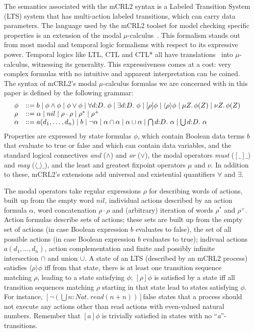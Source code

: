 \documentclass[letter]{llncs}
\begin{document}
The semantics associated with the mCRL2 syntax is a Labeled Transition System (LTS)
system that has multi-action labeled transitions, which can carry data parameters. The language used by the mCRL2
toolset for model checking specific properties is an extension of the modal
$\mu$-calculus~\cite{Emerson97modelchecking}. This formalism stands out from most modal and temporal logic formalisms with respect to its
expressive power. Temporal logics like LTL, CTL and CTL* all have translations~\cite{cranen2010linear,cranen2011linear} into $\mu$-calculus,
witnessing its generality. This expressiveness comes at a cost: very complex formulas with no intuitive and apparent interpretation can be coined. 
The syntax of mCRL2's modal $\mu$-calculus formulas we are concerned with in this paper
is defined by the following grammar:
\vspace{-5 pt}
\[
\begin{array}{ll}
\phi & ::= b \mid \phi\wedge\phi \mid \phi\vee\phi \mid \forall d{:}D.~\phi \mid \exists d{:}D.~\phi
\mid [\rho]\phi \mid \langle\rho\rangle\phi \mid \mu Z\ldotp\phi(Z) \mid \nu Z\ldotp\phi(Z) \\
\rho & ::= \alpha \mid nil \mid \rho\cdot\rho \mid \rho^* \mid \rho^+ \\
\alpha & ::= a(d_1,\dots,d_n) \mid b \mid \neg \alpha \mid \alpha\cap\alpha \mid 
\alpha\cup\alpha \mid \bigcap{d{:}D}.~\alpha \mid \bigcup{d{:}D}.~\alpha \\
\end{array}
\]
Properties are expressed by state formulas $\phi$, which contain
Boolean data terms $b$ that evaluate to true or false and which can contain data variables, and the
standard logical connectives \emph{and} ($\land$) and \emph{or}
($\lor$), the modal operators \emph{must} ($[\_]\_$) and \emph{may}
($\langle \_\rangle\_$), and the least and greatest fixpoint operators
$\mu$ and $\nu$. In addition to these, mCRL2's extensions add universal
and existential quantifiers $\forall$ and $\exists$.

The modal operators take regular expressions
$\rho$ for describing words of actions, built up from the empty word $nil$, individual
actions described by an action formula $\alpha$, word
concatenation $\rho \cdot \rho$ and (arbitrary) iteration of words $\rho^*$ and $\rho^+$.
Action formulas describe sets of actions; these sets are built up from the empty
set of actions (in case Boolean expression $b$ evaluates to false), the set of all possible actions
(in case Boolean expression $b$ evaluates to true); indivual actions $a(d_1,\dots,d_n)$, 
action complementation and finite and possibly infinite intersection $\cap$ and union $\cup$.
A state of an LTS (described by an mCRL2 process) satisfies $\langle \rho \rangle \phi$
iff from that state, there is at least one transition sequence matching $\rho$,
leading to a state satisfying $\phi$;
$[\rho]\phi$ is satisfied by a state iff all transition sequences matching $\rho$ starting in that 
state lead to states satisfying $\phi$.
For instance, $[\neg (\bigcup{n{:}Nat}.~
\textit{read}(n+n))]\text{false}$ states that a process should not execute any actions
other than read actions with even-valued natural numbers.
Remember that $[a]\phi$ is trivially satisfied in states with no ``\emph{a}''-transitions.
\end{document}
